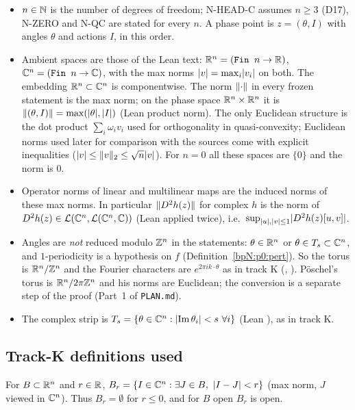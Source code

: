 \begin{itemize}
\item $n\in\mathbb{N}$ is the number of degrees of freedom; N-HEAD-C assumes $n\ge3$ (D17), N-ZERO and N-QC are stated
  for every $n$. A phase point is $z=(\theta,I)$ with angles $\theta$ and actions $I$, in this order.
\item Ambient spaces are those of the Lean text: $\mathbb{R}^n=(\texttt{Fin }n\to\mathbb{R})$, $\mathbb{C}^n=(\texttt{Fin }n\to\mathbb{C})$,
  with the max norms $\lvert v\rvert=\max_i\lvert v_i\rvert$ on both. The embedding $\mathbb{R}^n\subset\mathbb{C}^n$ is componentwise. The
  norm $\lVert \cdot\rVert$ in every frozen statement is the max norm; on the phase space $\mathbb{R}^n\times\mathbb{R}^n$ it is
  $\lVert (\theta,I)\rVert=\max(\lvert \theta\rvert,\lvert I\rvert)$ (Lean product norm). The only Euclidean structure is the dot product
  $\sum_i\omega_iv_i$ used for orthogonality in quasi-convexity; Euclidean norms used later for comparison with the
  sources come with explicit inequalities ($\lvert v\rvert\le\lVert v\rVert_2\le\sqrt n\lvert v\rvert$). For $n=0$ all these spaces are
  $\{0\}$ and the norm is $0$.
\item Operator norms of linear and multilinear maps are the induced norms of these max norms. In particular
  $\lVert D^2h(z)\rVert$ for complex $h$ is the norm of $D^2h(z)\in\mathcal L(\mathbb{C}^n,\mathcal L(\mathbb{C}^n,\mathbb{C}))$ (Lean
   applied twice), i.e.\ $\sup_{\lvert u\rvert,\lvert v\rvert\le1}\lvert D^2h(z)[u,v]\rvert$.
\item Angles are \emph{not} reduced modulo $\mathbb{Z}^n$ in the statements: $\theta\in\mathbb{R}^n$ or $\theta\in T_s\subset\mathbb{C}^n$,
  and $1$-periodicity is a hypothesis on $f$ (Definition~\ref{bpN:p0:pert}). So the torus is $\mathbb{R}^n/\mathbb{Z}^n$ and
  the Fourier characters are $e^{2\pi ik\cdot\theta}$ as in track K (,
  ). P\"oschel's torus is $\mathbb{R}^n/2\pi\mathbb{Z}^n$ and his norms are Euclidean; the conversion is
  a separate step of the proof (Part~1 of \texttt{PLAN.md}).
\item The complex strip is $T_s=\{\theta\in\C^n:\abs{\operatorname{Im}\theta_i}<s\ \forall i\}$ (Lean
  ), as in track K.
\end{itemize}

\subsection{Track-K definitions used}\label{bpN:p0:kdefs}

\begin{definition}\label{bpN:p0:actionnbhd}
For $B\subset\mathbb{R}^n$ and $r\in\mathbb{R}$, $B_r=\{I\in\C^n:\exists J\in B,\ \abs{I-J}<r\}$ (max norm, $J$ viewed in $\mathbb{C}^n$).
Thus $B_r=\emptyset$ for $r\le0$, and for $B$ open $B_r$ is open.
\end{definition}

